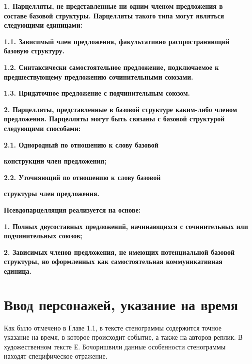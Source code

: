 \documentclass{kursa4}
\begin{document}
{      {\bfseries\color[rgb]{0.2,0.2,0.2}
      \textmd{}\textmd{1. Парцелляты, не представленные ни одним членом
      предложения в составе базовой структуры. Парцелляты такого типа могут
      являться следующими единицами:}}

      {\bfseries\color[rgb]{0.2,0.2,0.2}
      \textmd{1.1. Зависимый член предложения, факультативно
      распространяющий базовую структуру.}}

      {\bfseries\color[rgb]{0.2,0.2,0.2}
      \textmd{1.2. }\textmd{Синтаксически самостоятельное предложение,
      подключаемое к предшествующему предложению сочинительными союзами.}}

      {\bfseries\color[rgb]{0.2,0.2,0.2}
      \textmd{1.3. Придаточное предложение с подчинительным союзом.}}

      {\bfseries\color[rgb]{0.2,0.2,0.2}
      \textmd{2. Парцелляты, представленные в базовой структуре каким-либо
      членом предложения. Парцелляты могут быть связаны с базовой структурой
      следующими способами:}}

      {\bfseries\color[rgb]{0.2,0.2,0.2}
      \textmd{2.1. Однородный по отношению к слову базовой}}

      {\bfseries\color[rgb]{0.2,0.2,0.2}
      \textmd{конструкции член предложения;}}

      {\bfseries\color[rgb]{0.2,0.2,0.2}
      \textmd{2.2. Уточняющий по отношению к слову базовой}}

      {\bfseries\color[rgb]{0.2,0.2,0.2}
      \textmd{структуры член предложения.}}

      {\bfseries\color[rgb]{0.2,0.2,0.2}
      \textmd{}Псевдопарцелляция\textmd{ реализуется на основе:}}

      {\bfseries\color[rgb]{0.2,0.2,0.2}
      \textmd{1. }\textmd{Полных двусоставных п}\textmd{редложений,
      начинающихся с сочинительных или подчинительных союзов;}}

      {\bfseries\color[rgb]{0.2,0.2,0.2}
      \textmd{2. }\textmd{Зависимых членов предложения, }\textmd{не
      имеющих потенциальной базовой структуры, }\textmd{но оформленных как
      самостоятельная коммуникативная единица. }}




    \section{Ввод персонажей, указание на время}   
      Как было отмечено в Главе 1.1, в тексте стенограммы содержится точное указание на время, в которое происходит событие, а также на авторов реплик. В художественном тексте Е. Бочоришвили данные особенности стенограммы находят специфическое отражение. 

}
\end{document}

